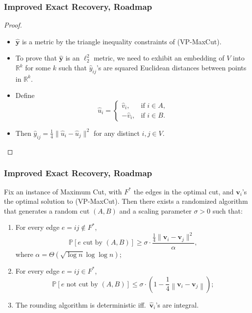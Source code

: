 \documentclass{beamer}
\newcommand{\RR}{\mathbb{R}}
\newcommand{\PP}{\mathbb{P}}
\begin{document}
    \begin{frame}
        \frametitle{Improved Exact Recovery, Roadmap}
    
        \begin{proof}
            \begin{itemize}
                \item $\mathbf{\hat y}$ is a metric by the triangle inequality constraints of {\sc (VP-MaxCut)}. \pause
                \item To prove that $\mathbf{\hat y}$ is an $\ell_2^2$ metric, we need to exhibit an embedding of $V$ into $\RR^k$ for some $k$ such that $\hat y_{ij}$'s are squared Euclidean distances between points in $\RR^k$. \pause
                \item Define
                $$ \hat u_i = \left\{
                    \begin{array}{ll}
                        \hat v_i, & \text{if $i \in A$}, \\
                        -\hat v_i, & \text{if $i \in B$}.
                    \end{array}
                \right. $$
                \pause
                \item Then $\hat y_{ij} = \frac{1}{4} \lVert \hat u_i - \hat u_j \rVert^2$ for any distinct $i, j \in V$.
            \end{itemize}
        \end{proof}
    \end{frame}

    \begin{frame}
        \frametitle{Improved Exact Recovery, Roadmap}

        \begin{lemma}
            Fix an instance of {\sc Maximum Cut}, with $F^*$ the edges in the optimal cut, and $\mathbf v_i$'s the optimal solution to {\sc (VP-MaxCut)}. Then there exists a randomized algorithm that generates a random cut $(A, B)$ and a scaling parameter $\sigma > 0$ such that:
            \begin{enumerate}
                \item For every edge $e = ij \not \in F^*$,
                $$ \PP[\text{$e$ cut by $(A, B)$}] \geq \sigma \cdot \frac{\frac{1}{4} \lVert \mathbf v_i - \mathbf v_j \rVert^2}{\alpha}, $$
                where $\alpha = \Theta(\sqrt{\log n} \log \log n)$;
                \item For every edge $e = ij \in F^*$,
                $$ \PP[\text{$e$ not cut by $(A, B)$}] \leq \sigma \cdot \left(1 - \frac{1}{4} \left\lVert \mathbf v_i - \mathbf v_j \right\rVert\right); $$
                \item The rounding algorithm is deterministic iff.\ $\mathbf{\hat v}_i$'s are integral.
            \end{enumerate}
        \end{lemma}
    \end{frame}
\end{document}
